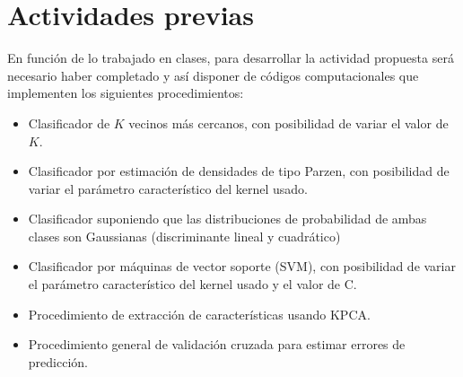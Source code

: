 \documentclass[fleqn,10pt]{SelfArx}
\affiliation{\textsuperscript{1}\textit{ITeDA, Mendoza, Argentina}}
\affiliation{*\textbf{Contacto}: angel.cancio@gmail.com} %
\begin{document}
\flushbottom %

\renewcommand{\abstractname}{Resumen}
\maketitle %

\renewcommand{\contentsname}{Indice}
\tableofcontents %

\thispagestyle{empty} %



\section*{Actividades previas} %
En función de lo trabajado en clases, para desarrollar la actividad propuesta será necesario
haber completado y así disponer de códigos computacionales que implementen los siguientes
procedimientos:
\begin{itemize}
\item Clasificador de $K$ vecinos más cercanos, con posibilidad de variar el valor de $K$.
\item Clasificador por estimación de densidades de tipo Parzen, con posibilidad de variar el parámetro característico del kernel usado.
\item Clasificador suponiendo que las distribuciones de probabilidad de ambas clases son Gaussianas (discriminante lineal y cuadrático)
\item Clasificador por máquinas de vector soporte (SVM), con posibilidad de variar el parámetro característico del kernel usado y el valor de C.
\item Procedimiento de extracción de características usando KPCA.
\item Procedimiento general de validación cruzada para estimar errores de predicción.
\end{itemize}
\end{document}
